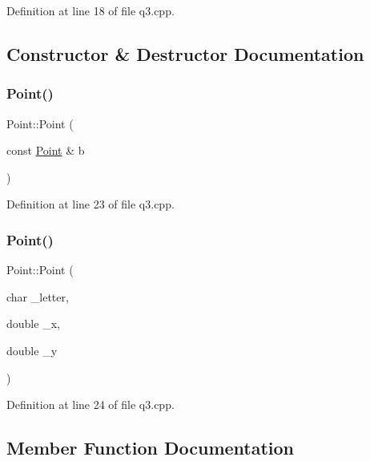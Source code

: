 Definition at line 18 of file q3.\+cpp.



\subsection{Constructor \& Destructor Documentation}
\mbox{\label{struct_point_a6e3c30c51464aef7ffc341246fd5f350}} 
\subsubsection{\texorpdfstring{Point()}{Point()}\hspace{0.1cm}{\footnotesize\ttfamily [1/2]}}
{\footnotesize\ttfamily Point\+::\+Point (\begin{DoxyParamCaption}\item[{const \hyperlink{struct_point}{Point} \&}]{b }\end{DoxyParamCaption})\hspace{0.3cm}{\ttfamily [inline]}}



Definition at line 23 of file q3.\+cpp.

\mbox{\label{struct_point_ab42957117da0adbb5d5838106e3c7a0c}} 
\subsubsection{\texorpdfstring{Point()}{Point()}\hspace{0.1cm}{\footnotesize\ttfamily [2/2]}}
{\footnotesize\ttfamily Point\+::\+Point (\begin{DoxyParamCaption}\item[{char}]{\+\_\+letter,  }\item[{double}]{\+\_\+x,  }\item[{double}]{\+\_\+y }\end{DoxyParamCaption})\hspace{0.3cm}{\ttfamily [inline]}}



Definition at line 24 of file q3.\+cpp.



\subsection{Member Function Documentation}
\mbox{\label{struct_point_a1b3079414ffe1de3dbc74516a71a4007}} 
